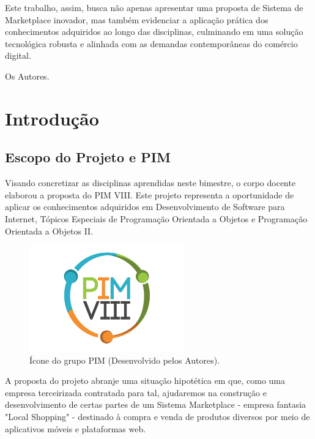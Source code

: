 \documentclass[
	12pt,				%
	openright,			%
	twoside,			%
	a4paper,			%
	english,			%
	brazil				%
	]{abntex2}
\begin{document}
Este trabalho, assim, busca não apenas apresentar uma proposta de Sistema de Marketplace inovador, mas também evidenciar a aplicação prática dos conhecimentos adquiridos ao longo das disciplinas, culminando em uma solução tecnológica robusta e alinhada com as demandas contemporâneas do comércio digital.

Os Autores.



\chapter{Introdução}\label{cap_introducao}

\section{Escopo do Projeto e PIM}

Visando concretizar as disciplinas aprendidas neste bimestre, o corpo docente elaborou a proposta do PIM VIII. Este projeto representa a oportunidade de aplicar os conhecimentos adquiridos em Desenvolvimento de Software para Internet, Tópicos Especiais de Programação Orientada a Objetos e Programação Orientada a Objetos II.

\begin{figure}[htb]
	\centering
	\includegraphics[width=0.6\textwidth]{img/PIM-VIII-LOGO}
	\caption{Ícone do grupo PIM (Desenvolvido pelos Autores).}
	\label{fig:logo-pim-viii}
\end{figure}

A proposta do projeto abranje uma situação hipotética em que, como uma empresa terceirizada contratada para tal, ajudaremos na construção e desenvolvimento de certas partes de um Sistema Marketplace - empresa fantasia "Local Shopping" -  destinado à compra e venda de produtos diversos por meio de aplicativos móveis e plataformas web.
\end{document}
